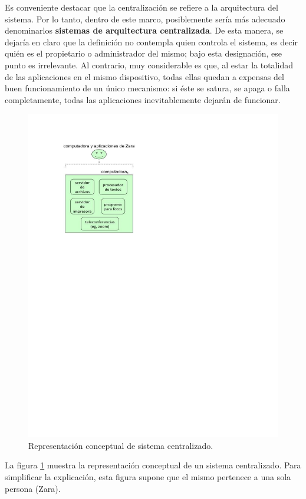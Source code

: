 \documentclass[12pt]{report} %
\begin{document}
Es conveniente destacar que la centralización se refiere a la arquitectura del sistema. Por lo tanto, dentro de este marco, posiblemente sería más adecuado denominarlos \textbf{sistemas de arquitectura centralizada}. De esta manera, se dejaría en claro que la definición no contempla quien controla el sistema, es decir quién es el propietario o administrador del mismo; bajo esta designación, ese punto es irrelevante. Al contrario, muy considerable es que, al estar la totalidad de las aplicaciones en el mismo dispositivo, todas ellas quedan a expensas del buen funcionamiento de un único mecanismo: si éste se satura, se apaga o falla completamente, todas las aplicaciones inevitablemente dejarán de funcionar.



\begin{figure}
\centering
\includegraphics[width=0.85\columnwidth]{imagenes/imagendesc1.pdf}
\caption{Representación conceptual de sistema centralizado.}
\label{imagendesc1}
\end{figure} 

La figura \ref{imagendesc1} muestra la representación conceptual de un sistema centralizado. Para simplificar la explicación, esta figura supone que el mismo pertenece a una sola persona (Zara). 
\end{document}
